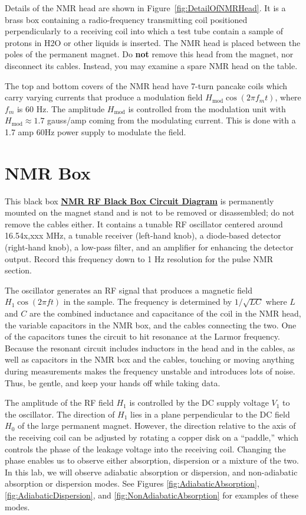 \documentclass{../lab}
\begin{document}
Details of the NMR head are shown in Figure~\ref{fig:DetailOfNMRHead}. It is a brass box containing a radio-frequency transmitting coil positioned perpendicularly to a receiving coil into which a test tube contain a sample of protons in H2O or other liquids is inserted. The NMR head is placed between the poles of the permanent magnet. Do \textbf{not} remove this head from the magnet, nor disconnect its cables. Instead, you may examine a spare NMR head on the table.

The top and bottom covers of the NMR head have 7-turn pancake coils which carry varying currents that produce a modulation field $H_\text{mod} \cos(2 \pi f_m t)$, where $f_m$ is 60 Hz. The amplitude $H_\text{mod}$ is controlled from the modulation unit with $H_\text{mod} \approx 1.7$ gauss/amp coming from the modulating current. This is done with a 1.7 amp 60Hz power supply to modulate the field.

\section{NMR Box}

This black box \href{http://experimentationlab.berkeley.edu/sites/default/files/images/NMR31.gif}{\textbf{NMR RF Black Box Circuit Diagram}}
is permanently mounted on the magnet stand and is not to be removed or disassembled; do not remove the cables either. It contains a tunable RF oscillator centered around 16.54x,xxx MHz, a tunable receiver (left-hand knob), a diode-based detector (right-hand knob), a low-pass filter, and an amplifier for enhancing the detector output. Record this frequency down to 1 Hz resolution for the pulse NMR section.

The oscillator generates an RF signal that produces a magnetic field $H_1\cos(2\pi f t)$ in the sample. The frequency is determined by $1/\sqrt{LC}$ where $L$ and $C$ are the combined inductance and capacitance of the coil in the NMR head, the variable capacitors in the NMR box, and the cables connecting the two. One of the capacitors tunes the circuit to hit resonance at the Larmor frequency. Because the resonant circuit includes inductors in the head and in the cables, as well as capacitors in the NMR box and the cables, touching or moving anything during measurements makes the frequency unstable and introduces lots of noise. Thus, be gentle, and keep your hands off while taking data.

The amplitude of the RF field $H_1$ is controlled by the DC supply voltage $V_1$ to the oscillator. The direction of $H_1$ lies in a plane perpendicular to the DC field $H_0$ of the large permanent magnet. However, the direction relative to the axis of the receiving coil can be adjusted by rotating a copper disk on a ``paddle,'' which controls the phase of the leakage voltage into the receiving coil. Changing the phase enables us to observe either absorption, dispersion or a mixture of the two. In this lab, we will observe adiabatic absorption or dispersion, and non-adiabatic absorption or dispersion modes. See Figures \ref{fig:AdiabaticAbsorption}, \ref{fig:AdiabaticDispersion}, and \ref{fig:NonAdiabaticAbsorption} for examples of these modes.
\end{document}
